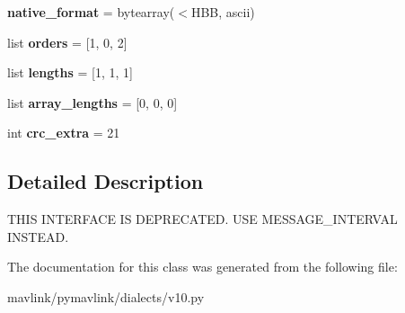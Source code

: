 \begin{DoxyCompactItemize}
{\bfseries native\+\_\+format} = bytearray(\textquotesingle{}$<$H\+BB\textquotesingle{}, \textquotesingle{}ascii\textquotesingle{})
\item 
\mbox{\label{classpymavlink_1_1dialects_1_1v10_1_1MAVLink__data__stream__message_a10cc6600adc3c82e7c3b36d53174fb1b}} 
list {\bfseries orders} = \mbox{[}1, 0, 2\mbox{]}
\item 
\mbox{\label{classpymavlink_1_1dialects_1_1v10_1_1MAVLink__data__stream__message_a68fac4a8f65e6ef4ac160552570392de}} 
list {\bfseries lengths} = \mbox{[}1, 1, 1\mbox{]}
\item 
\mbox{\label{classpymavlink_1_1dialects_1_1v10_1_1MAVLink__data__stream__message_af5859b2ba90697569a5a5dbbb263cfdf}} 
list {\bfseries array\+\_\+lengths} = \mbox{[}0, 0, 0\mbox{]}
\item 
\mbox{\label{classpymavlink_1_1dialects_1_1v10_1_1MAVLink__data__stream__message_a20031f7b66949122fbb2ddd0ea996d8a}} 
int {\bfseries crc\+\_\+extra} = 21
\end{DoxyCompactItemize}


\subsection{Detailed Description}
\begin{DoxyVerb}THIS INTERFACE IS DEPRECATED. USE MESSAGE_INTERVAL INSTEAD.
\end{DoxyVerb}
 

The documentation for this class was generated from the following file\+:\begin{DoxyCompactItemize}
\item 
mavlink/pymavlink/dialects/v10.\+py\end{DoxyCompactItemize}
